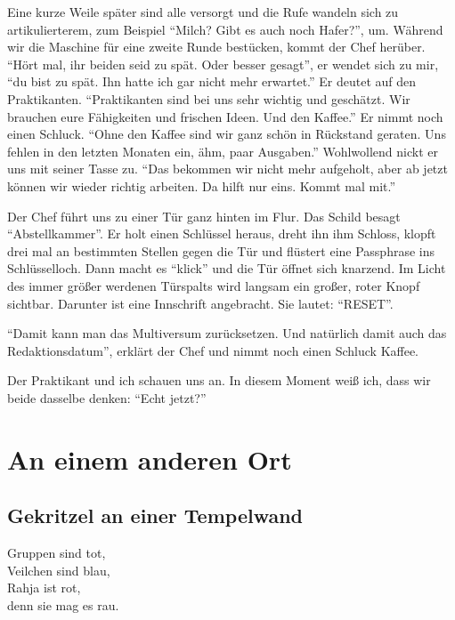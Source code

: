 \documentclass[final]{multiversum}
\begin{document}
Eine kurze Weile später sind alle versorgt und die Rufe wandeln sich zu artikulierterem, zum Beispiel \enquote{Milch? Gibt es auch noch Hafer?}, um.
Während wir die Maschine für eine zweite Runde bestücken, kommt der Chef herüber.
\enquote{Hört mal, ihr beiden seid zu spät. Oder besser gesagt}, er wendet sich zu mir, \enquote{du bist zu spät.
Ihn hatte ich gar nicht mehr erwartet.}
Er deutet auf den Praktikanten.
\enquote{Praktikanten sind bei uns sehr wichtig und geschätzt.
Wir brauchen eure Fähigkeiten und frischen Ideen. 
Und den Kaffee.}
Er nimmt noch einen Schluck.
\enquote{Ohne den Kaffee sind wir ganz schön in Rückstand geraten. 
Uns fehlen in den letzten Monaten ein, ähm, paar Ausgaben.}
Wohlwollend nickt er uns mit seiner Tasse zu.
\enquote{Das bekommen wir nicht mehr aufgeholt, aber ab jetzt können wir wieder richtig arbeiten.
Da hilft nur eins. 
Kommt mal mit.}

Der Chef führt uns zu einer Tür ganz hinten im Flur. 
Das Schild besagt \enquote{Abstellkammer}.
Er holt einen Schlüssel heraus, dreht ihn ihm Schloss, klopft drei mal an bestimmten Stellen gegen die Tür und flüstert eine Passphrase ins Schlüsselloch.
Dann macht es \enquote{klick} und die Tür öffnet sich knarzend.
Im Licht des immer größer werdenen Türspalts wird langsam ein großer, roter Knopf sichtbar.
Darunter ist eine Innschrift angebracht.
Sie lautet: \enquote{RESET}.

\enquote{Damit kann man das Multiversum zurücksetzen.
Und natürlich damit auch das Redaktionsdatum}, erklärt der Chef und nimmt noch einen Schluck Kaffee.

Der Praktikant und ich schauen uns an.
In diesem Moment weiß ich, dass wir beide dasselbe denken:
\enquote{Echt jetzt?}


\section{An einem anderen Ort}

\subsection{Gekritzel an einer Tempelwand}
Gruppen sind tot,\\
Veilchen sind blau,\\
Rahja ist rot,\\
denn sie mag es rau.\\
\end{document}
